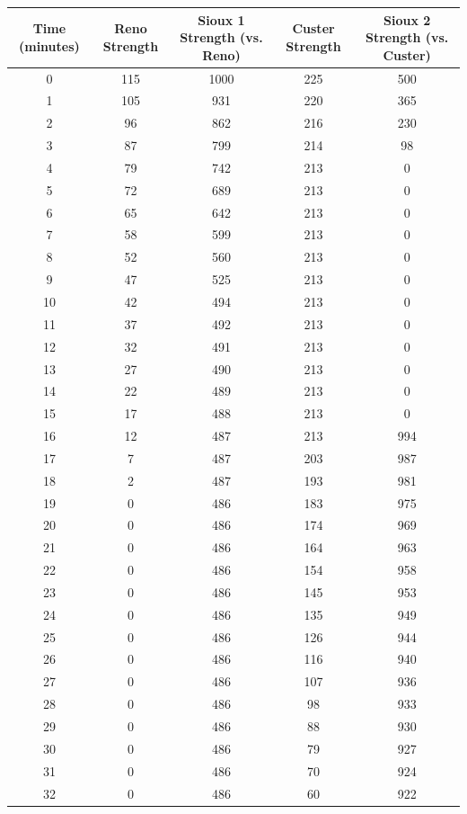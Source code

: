\documentclass[letterpaper,10pt]{article}
\newcommand*{\myalign}[2]{\multicolumn{1}{#1}{#2}}
\begin{document}
\begin{table}
\begin{center}
\begin{tabular}[h!tp]{ccccc}
\hline
\textbf{Time (minutes)} & \textbf{Reno Strength} & \myalign{p{3cm}}{\textbf{Sioux 1 Strength (vs. Reno)}} & \textbf{Custer Strength} & \myalign{p{3cm}}{\textbf{Sioux 2 Strength (vs. Custer)}} \\
\hline\hline
0 &	115 &	1000 &	225 &	500 \\
1 &	105 &	931 &	220 &	365 \\
2 &	96 &	862 &	216 &	230 \\
3 &	87 &	799 &	214 &	98 \\
4 &	79 &	742 &	213 &	0 \\
5 &	72 &	689 &	213 &	0 \\
6 &	65 &	642 &	213 &	0 \\
7 &	58 &	599 &	213 &	0 \\
8 &	52 &	560 &	213 &	0 \\
9 &	47 &	525 &	213 &	0 \\
10 &	42 &	494 &	213 &	0 \\
11 &	37 &	492 &	213 &	0 \\
12 &	32 &	491 &	213 &	0 \\
13 &	27 &	490 &	213 &	0 \\
14 &	22 &	489 &	213 &	0 \\
15 &	17 &	488 &	213 &	0 \\
16 &	12 &	487 &	213 &	994 \\
17 &	7 &	487 &	203 &	987 \\
18 &	2 &	487 &	193 &	981 \\
19 &	0 &	486 &	183 &	975 \\
20 &	0 &	486 &	174 &	969 \\
21 &	0 &	486 &	164 &	963 \\
22 &	0 &	486 &	154 &	958 \\
23 &	0 &	486 &	145 &	953 \\
24 &	0 &	486 &	135 &	949 \\
25 &	0 &	486 &	126 &	944 \\
26 &	0 &	486 &	116 &	940 \\
27 &	0 &	486 &	107 &	936 \\
28 &	0 &	486 &	98 &	933 \\
29 &	0 &	486 &	88 &	930 \\
30 &	0 &	486 &	79 &	927 \\
31 &	0 &	486 &	70 &	924 \\
32 &	0 &	486 &	60 &	922 \\

\end{tabular}
\end{center}
\end{table}
\end{document}

